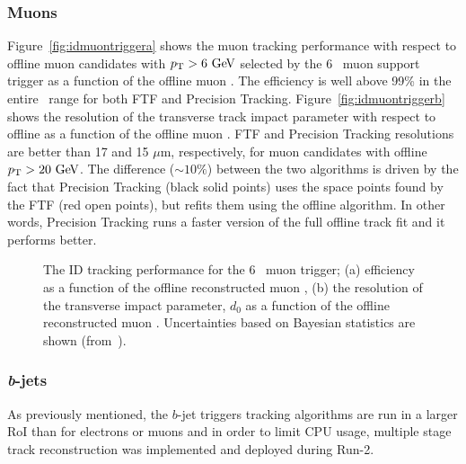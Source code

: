 			\subsubsection*{Muons}

				Figure~\ref{fig:idmuontriggera} shows the muon tracking performance with respect to offline muon candidates with $\pt > 6 \GeV$ selected by the 6 \GeV\ muon support trigger as a function of the offline muon \pt. The efficiency is well above 99\% in the entire \pt\ range for both \ac{FTF} and Precision Tracking. Figure~\ref{fig:idmuontriggerb} shows the resolution of the transverse track impact parameter with respect to offline as a function of the offline muon \pt. \ac{FTF} and Precision Tracking resolutions are better than 17 and 15 $\mu$m, respectively, for muon candidates with offline $\pt > 20 \GeV$. The difference ($\sim 10\%$) between the two algorithms is driven by the fact that Precision Tracking (black solid points) uses the space points found by the \ac{FTF} (red open points), but refits them using the offline algorithm. In other words, Precision Tracking runs a faster version of the full offline track fit and it performs better.

				\begin{figure}[!htb]
					\begin{center}
						\hspace{0.05\textwidth}
					\end{center}
					\caption{ 
					The ID tracking performance for the 6 \GeV\ muon trigger;
					(a) efficiency as a function of the offline reconstructed muon \pt,  
					(b) the resolution of the transverse impact parameter, $d_{0}$  as a function of the offline reconstructed muon \pt. Uncertainties based on Bayesian statistics are shown (from~\cite{ATLASTrigger2015}).}
					\label{fig:idmuontrigger}
				\end{figure}



			\subsubsection*{\emph{b}-jets}

				As previously mentioned, the $b$-jet triggers tracking algorithms are run in a larger \ac{RoI} than for electrons or muons and in order to limit \ac{CPU} usage, multiple stage track reconstruction was implemented and deployed during Run-2.


